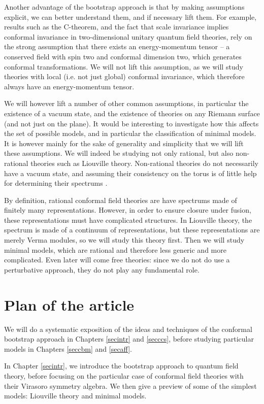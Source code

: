 \documentclass[12pt, a4paper, notitlepage, twoside]{report}
\numberwithin{equation}{section}
\theoremstyle{break}
\begin{document}
Another advantage of the bootstrap approach is that by making assumptions explicit, we can better understand them, and if necessary lift them.
For example, results such as the C-theorem, and the fact that scale invariance implies conformal invariance in two-dimensional unitary quantum field theories, rely on the strong assumption that there exists an energy-momentum tensor -- a conserved field with spin two and conformal dimension two, which generates conformal transformations.
We will not lift this assumption, as we will study theories with local (i.e.
not just global) conformal invariance, which therefore always have an energy-momentum tensor.

We will however lift a number of other common assumptions, in particular the existence of a vacuum state, and the existence of theories on any Riemann surface (and not just on the plane).
It would be interesting to investigate how this affects the set of possible models, and in particular the classification of minimal models.
It is however mainly for the sake of generality and simplicity that
we will lift these assumptions.
We will indeed be studying not only rational, but also non-rational theories such as Liouville theory.
Non-rational theories do not necessarily have a vacuum state, and assuming their consistency on the torus is of little help for determining their spectrums \cite{rib14}. 

By definition, rational conformal field theories are have spectrums made of finitely many representations.
However, in order to ensure closure under fusion, these representations must have complicated structures.
In Liouville theory, the spectrum is made of a continuum of representations, but these representations are merely Verma modules, so we will study this theory first.
Then we will study minimal models, which are rational and therefore less generic and more complicated.
Even later will come free theories: since we do not do use a perturbative approach, they do not play any fundamental role. 


\section{Plan of the article \label{secplan}}

We will do a systematic exposition of the ideas and techniques of the conformal bootstrap approach in Chapters \ref{secintr} and \ref{secccs}, before studying particular models in Chapters \ref{seccbm} and \ref{secaff}.

In Chapter \ref{secintr}, we introduce the bootstrap approach to quantum field theory, before focusing on the particular case of conformal field theories with their Virasoro symmetry algebra.
We then give a preview of some of the simplest models: Liouville theory and minimal models.
\end{document}
